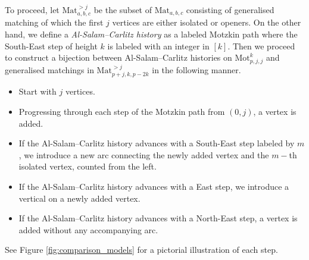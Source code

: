 \documentclass{amsart}
\theoremstyle{plain}
\theoremstyle{remark}
\numberwithin{equation}{section}
\begin{document}
To proceed, let ${\mathrm{Mat}}_{a,b,c}^{>j}$ be the subset of ${\mathrm{Mat}}_{a,b,c}$ consisting of generalised matching of which the first $j$ vertices are either isolated or openers. On the other hand, we define a \textit{Al-Salam--Carlitz history} as a labeled Motzkin path where the South-East step of height $k$ is labeled with an integer in $[k]$. Then we proceed to construct a bijection between Al-Salam--Carlitz histories on $\mathrm{Mot}_{p,j,j}^{k}$ and generalised matchings in ${\mathrm{Mat}}_{p+j,k,p-2k}^{>j}$ in the following manner.
\begin{itemize}
    \item Start with $j$ vertices.
    \smallskip 
    \item Progressing through each step of the Motzkin path from $(0,j)$, a vertex is added.
      \smallskip 
    \item If the Al-Salam--Carlitz history advances with a South-East step labeled by $m$, we introduce a new arc connecting the newly added vertex and the $m-$th isolated vertex, counted from the left.
      \smallskip 
    \item If the Al-Salam--Carlitz history advances with a East step, we introduce a vertical on a newly added vertex.
      \smallskip 
    \item If the Al-Salam--Carlitz history advances with a North-East step, a vertex is added without any accompanying arc.
\end{itemize}
See Figure \ref{fig:comparison_models} for a pictorial illustration of each step.
\end{document}
